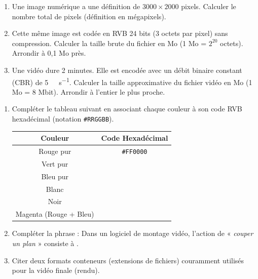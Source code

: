 \documentclass[11pt]{article}
\begin{document}
\begin{exercice}
\begin{enumerate}
    \item Une image numérique a une définition de $3000 \times 2000$ pixels. Calculer le nombre total de pixels (définition en mégapixels).
    \item Cette même image est codée en RVB 24 bits (3 octets par pixel) sans compression. Calculer la taille brute du fichier en Mo (1 Mo = $2^{20}$ octets). Arrondir à 0,1 Mo près.
    \item Une vidéo dure 2 minutes. Elle est encodée avec un débit binaire constant (CBR) de \SI{5}{\mega\bit\per\second}. Calculer la taille approximative du fichier vidéo en Mo (1 Mo = 8 Mbit). Arrondir à l'entier le plus proche.
\end{enumerate}
\end{exercice}

\begin{exercice}
\begin{enumerate}
    \item Compléter le tableau suivant en associant chaque couleur à son code RVB hexadécimal (notation \texttt{\#RRGGBB}).
    \begin{center}
    \begin{tabular}{|c|c|}
    \hline
    \textbf{Couleur} & \textbf{Code Hexadécimal} \\ \hline
    Rouge pur & \texttt{\#FF0000} \\ \hline
    Vert pur &  \\ \hline
    Bleu pur &  \\ \hline
    Blanc &  \\ \hline
    Noir &  \\ \hline
    Magenta (Rouge + Bleu) &  \\ \hline
    \end{tabular}
    \end{center}
    \item Compléter la phrase : Dans un logiciel de montage vidéo, l'action de « \textit{couper un plan} » consiste à \underline{\hspace{5cm}}.
    \item Citer deux formats conteneurs (extensions de fichiers) couramment utilisés pour la vidéo finale (rendu).
\end{enumerate}
\end{exercice}
\end{document}
